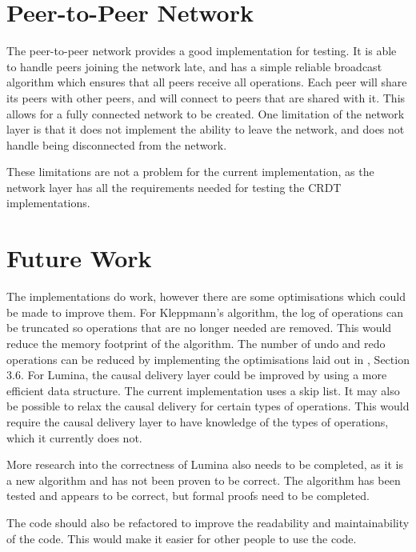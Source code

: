 \documentclass[12pt]{report}
\begin{document}
\section{Peer-to-Peer Network}
The peer-to-peer network provides a good implementation for testing. It is able to handle peers joining the network late, and has a simple reliable broadcast algorithm which ensures that all peers receive all operations. Each peer will share its peers with other peers, and will connect to peers that are shared with it. This allows for a fully connected network to be created. One limitation of the network layer is that it does not implement the ability to leave the network, and does not handle being disconnected from the network. \par

These limitations are not a problem for the current implementation, as the network layer has all the requirements needed for testing the CRDT implementations.


\section{Future Work}\label{sec:future_work}
The implementations do work, however there are some optimisations which could be made to improve them. For Kleppmann's algorithm, the log of operations can be truncated so operations that are no longer needed are removed. This would reduce the memory footprint of the algorithm. The number of undo and redo operations can be reduced by implementing the optimisations laid out in \cite{9563274}, Section 3.6. For Lumina, the causal delivery layer could be improved by using a more efficient data structure. The current implementation uses a skip list. It may also be possible to relax the causal delivery for certain types of operations. This would require the causal delivery layer to have knowledge of the types of operations, which it currently does not. \par

More research into the correctness of Lumina also needs to be completed, as it is a new algorithm and has not been proven to be correct. The algorithm has been tested and appears to be correct, but formal proofs need to be completed. \par

The code should also be refactored to improve the readability and maintainability of the code. This would make it easier for other people to use the code. \par
\end{document}
